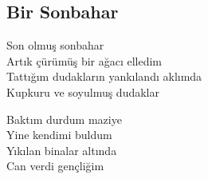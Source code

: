 \subsection{Bir Sonbahar}

Son olmuş sonbahar \\
Artık çürümüş bir ağacı elledim \\
Tattığım dudakların yankılandı aklımda \\
Kupkuru ve soyulmuş dudaklar

\noindent\newline
Baktım durdum maziye \\
Yine kendimi buldum \\
Yıkılan binalar altında \\
Can verdi gençliğim